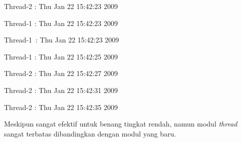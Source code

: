 \documentclass{wileySix}
\begin{document}
\begin{myEnumerate}
\noindent 
\begin{center}{\fontsize{10pt}{10pt}\selectfont Thread-2 : Thu Jan 22 15:42:23 2009}\end{center} \par
\noindent 
\begin{center}{\fontsize{10pt}{10pt}\selectfont Thread-1 : Thu Jan 22 15:42:23 2009}\end{center} \par
\noindent 
\begin{center}{\fontsize{10pt}{10pt}\selectfont Thread-1~:  Thu Jan 22 15:42:23 2009}\end{center} \par
\noindent 
\begin{center}{\fontsize{10pt}{10pt}\selectfont Thread-1 : Thu Jan 22 15:42:25 2009}\end{center} \par
\noindent 
\begin{center}{\fontsize{10pt}{10pt}\selectfont Thread-2 : Thu Jan 22 15:42:27 2009}\end{center} \par
\noindent 
\begin{center}{\fontsize{10pt}{10pt}\selectfont Thread-2 : Thu Jan 22 15:42:31 2009}\end{center} \par
\noindent 
\begin{center}{\fontsize{10pt}{10pt}\selectfont Thread-2 : Thu Jan 22 15:42:35 2009}\end{center} \par
\vspace{12pt}
Meskipun sangat efektif untuk benang tingkat rendah, namun modul \textit{thread} sangat terbatas dibandingkan dengan modul yang baru. \par
\vspace{12pt}

\end{myEnumerate}
\end{document}
